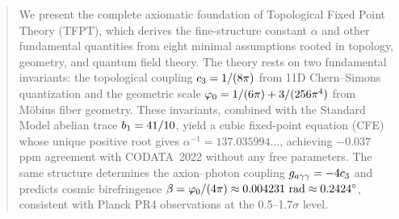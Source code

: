 
\maketitle

\begin{abstract}
We present the complete axiomatic foundation of Topological Fixed Point Theory (TFPT), 
which derives the fine-structure constant $\alpha$ and other fundamental quantities 
from eight minimal assumptions rooted in topology, geometry, and quantum field theory. 
The theory rests on two fundamental invariants: the topological coupling 
$\cthree = 1/(8\pi)$ from 11D Chern--Simons quantization and the geometric scale 
$\phiz = 1/(6\pi) + 3/(256\pi^4)$ from M\"obius fiber geometry. 
These invariants, combined with the Standard Model abelian trace $\bone = 41/10$, 
yield a cubic fixed-point equation (CFE) whose unique positive root gives 
$\alpha^{-1} = 137.035994\ldots$, achieving $-0.037$ ppm agreement with CODATA~2022 
without any free parameters. The same structure determines the axion--photon coupling 
$\gagg = -4\cthree$ and predicts cosmic birefringence $\beta = \phiz/(4\pi) \approx 0.004231~\text{rad} \approx 0.2424^\circ$, 
consistent with Planck PR4 observations at the 0.5--1.7$\sigma$ level.
\end{abstract}

